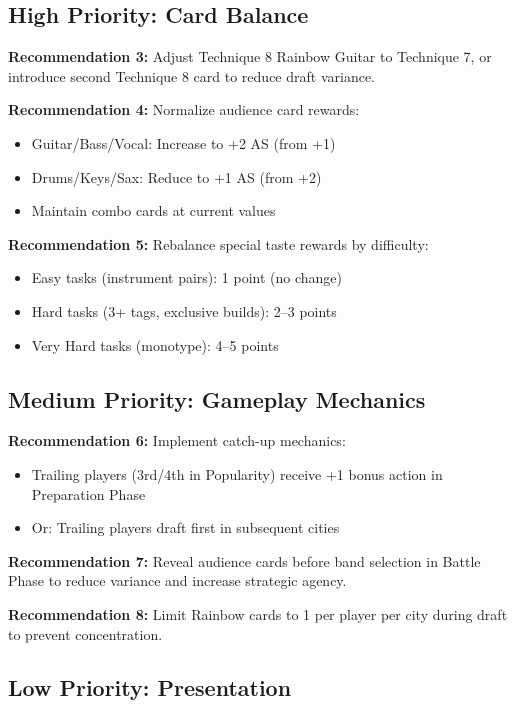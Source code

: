 \documentclass[11pt,a4paper]{article}
\begin{document}
\subsection{High Priority: Card Balance}

\textbf{Recommendation 3:} Adjust Technique 8 Rainbow Guitar to Technique 7, or introduce second Technique 8 card to reduce draft variance.

\textbf{Recommendation 4:} Normalize audience card rewards:
\begin{itemize}
    \item Guitar/Bass/Vocal: Increase to +2 AS (from +1)
    \item Drums/Keys/Sax: Reduce to +1 AS (from +2)
    \item Maintain combo cards at current values
\end{itemize}

\textbf{Recommendation 5:} Rebalance special taste rewards by difficulty:
\begin{itemize}
    \item Easy tasks (instrument pairs): 1 point (no change)
    \item Hard tasks (3+ tags, exclusive builds): 2--3 points
    \item Very Hard tasks (monotype): 4--5 points
\end{itemize}

\subsection{Medium Priority: Gameplay Mechanics}

\textbf{Recommendation 6:} Implement catch-up mechanics:
\begin{itemize}
    \item Trailing players (3rd/4th in Popularity) receive +1 bonus action in Preparation Phase
    \item Or: Trailing players draft first in subsequent cities
\end{itemize}

\textbf{Recommendation 7:} Reveal audience cards before band selection in Battle Phase to reduce variance and increase strategic agency.

\textbf{Recommendation 8:} Limit Rainbow cards to 1 per player per city during draft to prevent concentration.

\subsection{Low Priority: Presentation}
\end{document}
